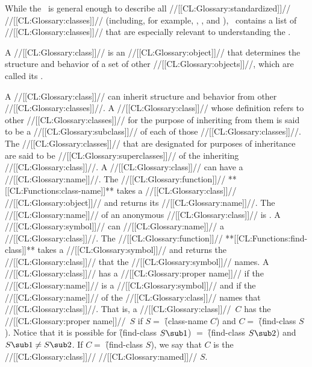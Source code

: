 

While the \CLOS\ is general enough to describe all //[[CL:Glossary:standardized]]// //[[CL:Glossary:classes]]// (including, for example, , , and ), \thenextfigure\ contains a list of //[[CL:Glossary:classes]]// that are especially relevant to understanding the \CLOS.

 


A //[[CL:Glossary:class]]// is an //[[CL:Glossary:object]]// that determines the structure and behavior  of a set of other //[[CL:Glossary:objects]]//, which are called its .   

A //[[CL:Glossary:class]]// can inherit structure and behavior from other //[[CL:Glossary:classes]]//. A //[[CL:Glossary:class]]// whose definition refers to other //[[CL:Glossary:classes]]// for the purpose  of inheriting from them is said to be a //[[CL:Glossary:subclass]]// of each of those //[[CL:Glossary:classes]]//. The //[[CL:Glossary:classes]]// that are designated for purposes of inheritance are said to be //[[CL:Glossary:superclasses]]// of the inheriting //[[CL:Glossary:class]]//.
                                               A //[[CL:Glossary:class]]// can have a //[[CL:Glossary:name]]//. The //[[CL:Glossary:function]]// **[[CL:Functions:class-name]]**  takes a //[[CL:Glossary:class]]// //[[CL:Glossary:object]]// and returns its //[[CL:Glossary:name]]//.  The //[[CL:Glossary:name]]// of an anonymous //[[CL:Glossary:class]]// is \nil.  A //[[CL:Glossary:symbol]]//  can //[[CL:Glossary:name]]// a //[[CL:Glossary:class]]//. The //[[CL:Glossary:function]]// **[[CL:Functions:find-class]]** takes a //[[CL:Glossary:symbol]]// and returns the //[[CL:Glossary:class]]// that the //[[CL:Glossary:symbol]]// names. A //[[CL:Glossary:class]]// has a //[[CL:Glossary:proper name]]// if the //[[CL:Glossary:name]]// is a //[[CL:Glossary:symbol]]// and if the //[[CL:Glossary:name]]// of the //[[CL:Glossary:class]]// names that //[[CL:Glossary:class]]//. That is, a //[[CL:Glossary:class]]//~$C$ has the //[[CL:Glossary:proper name]]//~$S$ if $S=$ \f{(class-name $C$)} and $C=$ \f{(find-class $S$)}. Notice that it is possible for  \f{(find-class $S\sub 1$)} $=$ \f{(find-class $S\sub 2$)} and $S\sub 1\neq S\sub 2$. If $C=$ \f{(find-class $S$)}, we say that $C$ is the //[[CL:Glossary:class]]// //[[CL:Glossary:named]]// $S$.

